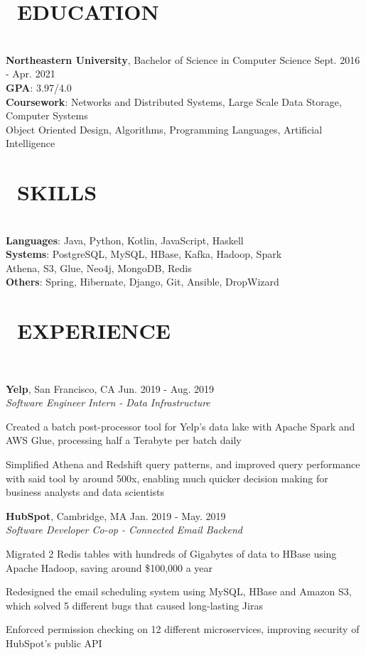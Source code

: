 \documentclass[11pt]{res}
\newcommand{\sectionunderline}{\vspace{-3mm}\hrulefill\\}
\newcommand{\listingtab}{\tabto{2.8cm}}
\newcommand{\newsect}[1]{\section{\Large \bf #1}}
\newcommand{\email}[1]{\faEnvelope\hspace{1mm} \href{mailto:#1}{#1}}
\newcommand{\phone}[1]{\faMobilePhone\hspace{1mm} #1}
\newcommand{\github}[1]{\faGithubAlt\hspace{1mm} \href{https://github.com/#1}{#1}}
\newcommand{\linkedin}[1]{\faLinkedinSquare\hspace{1mm} \href{https://linkedin.com/in/#1}{#1}}
\begin{document}
\address{
  \large\phone{(802) 503-5089}\:
  \large{$\bullet$}
  \large\email{derekpham67@gmail.com}\:
  \large{$\bullet$}
  \large\github{derekpham}\:
  \large{$\bullet$}
  \large\linkedin{derek-pham97}\\
}

\begin{resume}
  \newsect{\faGraduationCap\ EDUCATION}{
    \sectionunderline{
      {\bf Northeastern University}, Bachelor of Science in Computer Science \hfill Sept. 2016 - Apr. 2021\\
      {\bf GPA}: \listingtab 3.97/4.0\\
      {\bf Coursework}: \listingtab Networks and Distributed Systems, Large Scale Data Storage, Computer Systems\\
      \listingtab Object Oriented Design, Algorithms, Programming Languages, Artificial Intelligence
    }
  }

  \newsect{\faCogs\ SKILLS}{
    \sectionunderline{
      {\bf Languages}: \listingtab Java, Python, Kotlin, JavaScript, Haskell\\
      {\bf Systems}: \listingtab PostgreSQL, MySQL, HBase, Kafka, Hadoop, Spark\\
      \listingtab Athena, S3, Glue, Neo4j, MongoDB, Redis\\
      {\bf Others}: \listingtab Spring, Hibernate, Django, Git, Ansible, DropWizard
    }
  }

  \newsect{\faUsers\ EXPERIENCE}{
    \sectionunderline{
      {\bf Yelp}, San Francisco, CA \hfill Jun. 2019 - Aug. 2019\\
      {\it Software Engineer Intern - Data Infrastructure}
      \begin{itemize}
        {\item Created a batch post-processor tool for Yelp's data lake with Apache Spark and AWS Glue, processing half a Terabyte per batch daily}
        {\item Simplified Athena and Redshift query patterns, and improved query performance with said tool by around 500x, enabling much quicker decision making for business analysts and data scientists}
      \end{itemize}

      {\bf HubSpot}, Cambridge, MA \hfill Jan. 2019 - May. 2019\\
      {\it Software Developer Co-op - Connected Email Backend}
      \begin{itemize}
        {\item Migrated 2 Redis tables with hundreds of Gigabytes of data to HBase using Apache Hadoop, saving around \$100,000 a year}
        {\item Redesigned the email scheduling system using MySQL, HBase and Amazon S3, which solved 5 different bugs that caused long-lasting Jiras}
        {\item Enforced permission checking on 12 different microservices, improving security of HubSpot's public API}
      \end{itemize}

}}
\end{resume}
\end{document}
